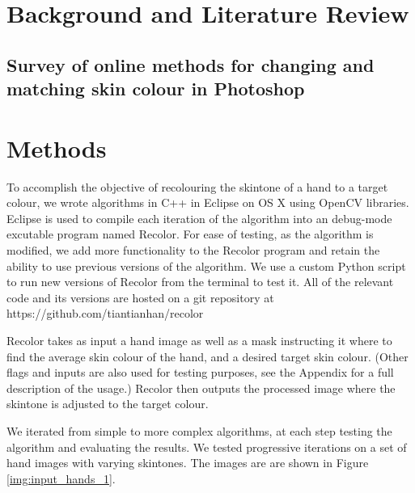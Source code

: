\documentclass[12pt, a4paper]{article}
\begin{document}
\listoffigures
\listoftables

\pagebreak

\section{Background and Literature Review}
\subsection{Survey of online methods for changing and matching skin colour in Photoshop}

\section{Methods}
To accomplish the objective of recolouring the skintone of a hand to a target colour, we wrote algorithms in C++ in Eclipse on OS X using OpenCV libraries. Eclipse is used to compile each iteration of the algorithm into an debug-mode excutable program named Recolor. For ease of testing, as the algorithm is modified, we add more functionality to the Recolor program and retain the ability to use previous versions of the algorithm. We use a custom Python script to run new versions of Recolor from the terminal to test it. All of the relevant code and its versions are hosted on a git repository at https://github.com/tiantianhan/recolor 

Recolor takes as input a hand image as well as a mask instructing it where to find the average skin colour of the hand, and a desired target skin colour. (Other flags and inputs are also used for testing purposes, see the Appendix for a full description of the usage.) Recolor then outputs the processed image where the skintone is adjusted to the target colour.

We iterated from simple to more complex algorithms, at each step testing the algorithm and evaluating the results. We tested progressive iterations on a set of hand images with varying skintones. The images are are shown in Figure \ref{img:input_hands_1}.

\end{document}
